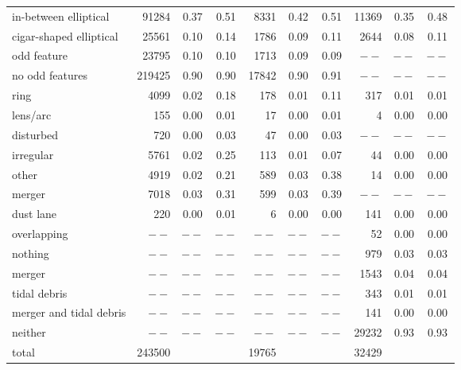 \documentclass[iop,apj,tighten]{emulateapj}
\begin{document}
\begin{table*}
\begin{tabular}{l|rcc|rcc|rcc}
    in-between elliptical   &  91284 & 0.37    & 0.51    &   8331 & 0.42    & 0.51    & 11369 & 0.35    & 0.48 \\
    cigar-shaped elliptical &  25561 & 0.10    & 0.14    &   1786 & 0.09    & 0.11    &  2644 & 0.08    & 0.11 \\
    \hline                                                                            
    odd feature             &  23795 & 0.10    & 0.10    &   1713 & 0.09    & 0.09    &  $--$ & $--$    & $--$ \\
    no odd features         & 219425 & 0.90    & 0.90    &  17842 & 0.90    & 0.91    &  $--$ & $--$    & $--$ \\
    \hline                                                                            
    ring                    &   4099 & 0.02    & 0.18    &    178 & 0.01    & 0.11    &   317 & 0.01    & 0.01 \\
    lens/arc                &    155 & 0.00    & 0.01    &     17 & 0.00    & 0.01    &     4 & 0.00    & 0.00    \\
    disturbed               &    720 & 0.00    & 0.03    &     47 & 0.00    & 0.03    &  $--$ & $--$    & $--$ \\
    irregular               &   5761 & 0.02    & 0.25    &    113 & 0.01    & 0.07    &    44 & 0.00    & 0.00    \\
    other                   &   4919 & 0.02    & 0.21    &    589 & 0.03    & 0.38    &    14 & 0.00    & 0.00    \\
    merger                  &   7018 & 0.03    & 0.31    &    599 & 0.03    & 0.39    &  $--$ & $--$    & $--$ \\
    dust lane               &    220 & 0.00    & 0.01    &      6 & 0.00    & 0.00    &   141 & 0.00    & 0.00    \\
    overlapping             &   $--$ & $--$    & $--$    &   $--$ & $--$    & $--$    &    52 & 0.00    & 0.00    \\
    nothing                 &   $--$ & $--$    & $--$    &   $--$ & $--$    & $--$    &   979 & 0.03    & 0.03 \\
    \hline
    merger                  & $--$ & $--$ & $--$ & $--$ & $--$ & $--$ &  1543 & 0.04 & 0.04 \\
    tidal debris            & $--$ & $--$ & $--$ & $--$ & $--$ & $--$ &   343 & 0.01 & 0.01 \\
    merger and tidal debris & $--$ & $--$ & $--$ & $--$ & $--$ & $--$ &   141 & 0.00    & 0.00    \\
    neither                 & $--$ & $--$ & $--$ & $--$ & $--$ & $--$ & 29232 & 0.93 & 0.93 \\
    \hline
    total                   & 243500 &      &      & 19765     &      &                &  32429 &      &                                    \\
    \hline\hline
\end{tabular}
\end{table*}
\end{document}
